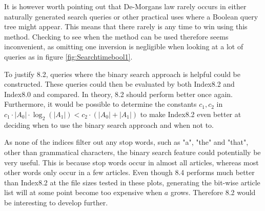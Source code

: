 It is however worth pointing out that De-Morgans law rarely occurs in either naturally generated search queries or other practical uses where a Boolean query tree might appear. This means that there rarely is any time to win using this method. Checking to see when the method can be used therefore seems inconvenient, as omitting one inversion is negligible when looking at a lot of queries as in figure \ref{fig:Searchtimebool1}.

To justify 8.2, queries where the binary search approach is helpful could be constructed. These queries could then be evaluated by both Index8.2 and Index8.0 and compared. In theory, 8.2 should perform better once again. Furthermore, it would be possible to determine the constants $c_1, c_2$ in $c_1\cdot|A_0| \cdot \log_2(|A_1|) < c_2\cdot (|A_0| +  |A_1|)$ to make Index8.2 even better at deciding when to use the binary search approach and when not to.

As none of the indices filter out any stop words, such as "a", "the" and "that", other than grammatical characters, the binary search feature could potentially be very useful. This is because stop words occur in almost all articles, whereas most other words only occur in a few articles. Even though 8.4 performs much better than Index8.2 at the file sizes tested in these plots, generating the bit-wise article list will at some point become too expensive when $a$ grows. Therefore 8.2 would be interesting to develop further.

